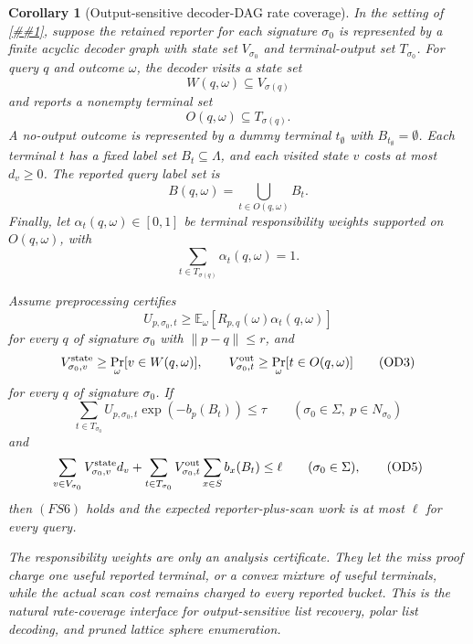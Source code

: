 \documentclass[10pt]{article}
\newcommand{\cref}[1]{\ref{##1}}
\newtheorem{corollary}[theorem]{Corollary}
\theoremstyle{definition}
\newcommand{\E}{\mathbb{E}}
\begin{document}
\begin{corollary}[Output-sensitive decoder-DAG rate coverage]
   \label{cor:output-sensitive-decoder-dag-rate-coverage}
   In the setting of \cref{lem:finite-signature-rate-coverage}, suppose the
   retained reporter for each signature \(\sigma_0\) is represented by a finite
   acyclic decoder graph with state set \(V_{\sigma_0}\) and terminal-output
   set \(T_{\sigma_0}\).  For query \(q\) and outcome \(\omega\), the decoder
   visits a state set
   \[
      W(q,\omega)\subseteq V_{\sigma(q)}
   \]
   and reports a nonempty terminal set
   \[
      O(q,\omega)\subseteq T_{\sigma(q)} .
   \]
   A no-output outcome is represented by a dummy terminal \(t_\emptyset\) with
   \(B_{t_\emptyset}=\emptyset\).  Each terminal \(t\) has a fixed label set
   \(B_t\subseteq\Lambda\), and each visited state \(v\) costs at most
   \(d_v\ge0\).  The reported query label set is
   \[
      B(q,\omega)=\bigcup_{t\in O(q,\omega)}B_t .
      \tag{OD0}
   \]
   Finally, let \(\alpha_t(q,\omega)\in[0,1]\) be terminal responsibility
   weights supported on \(O(q,\omega)\), with
   \[
      \sum_{t\in T_{\sigma(q)}}\alpha_t(q,\omega)=1 .
      \tag{OD1}
   \]

   Assume preprocessing certifies
   \[
      U_{p,\sigma_0,t}
      \ge
      \E_\omega\!\left[
         R_{p,q}(\omega)\alpha_t(q,\omega)
      \right]
      \tag{OD2}
   \]
   for every \(q\) of signature \(\sigma_0\) with \(\|p-q\|\le r\), and
   \[
      V^{\rm state}_{\sigma_0,v}
      \ge
      \Pr_\omega[v\in W(q,\omega)],
      \qquad
      V^{\rm out}_{\sigma_0,t}
      \ge
      \Pr_\omega[t\in O(q,\omega)]
      \tag{OD3}
   \]
   for every \(q\) of signature \(\sigma_0\).  If
   \[
      \sum_{t\in T_{\sigma_0}}
      U_{p,\sigma_0,t}\exp(-b_p(B_t))
      \le\tau
      \qquad(\sigma_0\in\Sigma,\ p\in N_{\sigma_0})
      \tag{OD4}
   \]
   and
   \[
      \sum_{v\in V_{\sigma_0}}V^{\rm state}_{\sigma_0,v}d_v
      +
      \sum_{t\in T_{\sigma_0}}
      V^{\rm out}_{\sigma_0,t}\sum_{x\in S}b_x(B_t)
      \le\ell
      \qquad(\sigma_0\in\Sigma),
      \tag{OD5}
   \]
   then \((FS6)\) holds and the expected reporter-plus-scan work is at most
   \(\ell\) for every query.

   The responsibility weights are only an analysis certificate.  They let the
   miss proof charge one useful reported terminal, or a convex mixture of useful
   terminals, while the actual scan cost remains charged to every reported
   bucket.  This is the natural rate-coverage interface for output-sensitive
   list recovery, polar list decoding, and pruned lattice sphere enumeration.
\end{corollary}
\end{document}
